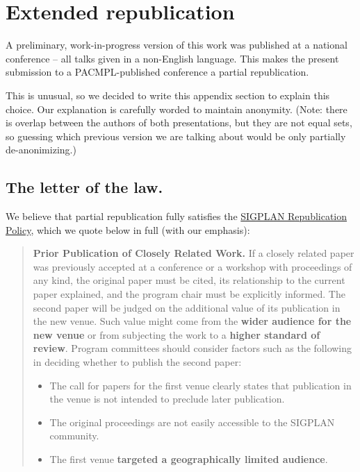 \section{Extended republication}
\label{app:extended-republication}

A preliminary, work-in-progress version of this work was published at
a national conference -- all talks given in a non-English
language. This makes the present submission to a PACMPL-published
conference a partial republication.

This is unusual, so we decided to write this appendix section to
explain this choice. Our explanation is carefully worded to maintain
anonymity. (Note: there is overlap between the authors of both
presentations, but they are not equal sets, so guessing which previous
version we are talking about would be only partially de-anonimizing.)

\subsection{The letter of the law.}

We believe that partial republication fully satisfies the
\href{http://www.sigplan.org/Resources/Policies/Republication/}{SIGPLAN
  Republication Policy}, which we quote below in full
(with our emphasis):

\begin{quote}
  \textbf{Prior Publication of Closely Related Work.}  If a closely
  related paper was previously accepted at a conference or a workshop
  with proceedings of any kind, the original paper must be cited, its
  relationship to the current paper explained, and the program chair
  must be explicitly informed. The second paper will be judged on the
  additional value of its publication in the new venue. Such value
  might come from the \textbf{wider audience for the new venue} or
  from subjecting the work to a \textbf{higher standard of
    review}. Program committees should consider factors such as the
  following in deciding whether to publish the second paper:
    \begin{itemize}
    \item The call for papers for the first venue clearly states that publication in the venue is not intended to preclude later publication.
    \item The original proceedings are not easily accessible to the SIGPLAN community.
    \item The first venue \textbf{targeted a geographically limited audience}.
    \end{itemize}
\end{quote}

